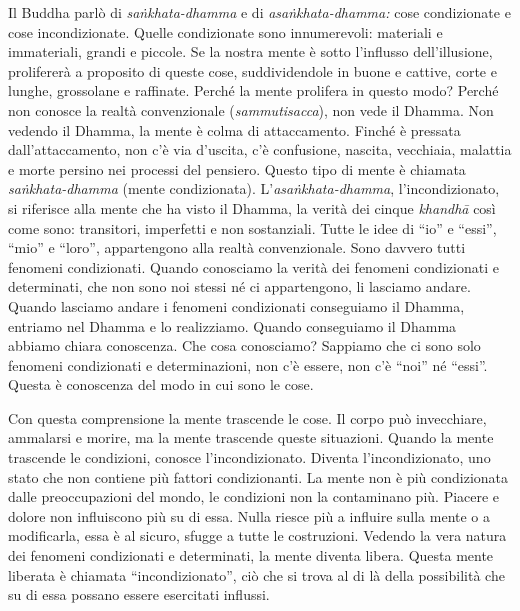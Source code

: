 Il Buddha parlò di \emph{saṅkhata-dhamma} e di \emph{asaṅkhata-dhamma:}
cose condizionate e cose incondizionate. Quelle condizionate sono
innumerevoli: materiali e immateriali, grandi e piccole. Se la nostra
mente è sotto l'influsso dell'illusione, prolifererà a proposito di
queste cose, suddividendole in buone e cattive, corte e lunghe,
grossolane e raffinate. Perché la mente prolifera in questo modo? Perché
non conosce la realtà convenzionale (\emph{sammutisacca}), non vede il
Dhamma. Non vedendo il Dhamma, la mente è colma di attaccamento. Finché
è pressata dall'attaccamento, non c'è via d'uscita, c'è confusione,
nascita, vecchiaia, malattia e morte persino nei processi del pensiero.
Questo tipo di mente è chiamata \emph{saṅkhata-dhamma} (mente
condizionata). L'\emph{asaṅkhata-dhamma}, l'incondizionato, si
riferisce alla mente che ha visto il Dhamma, la verità dei cinque
\emph{khandhā} così come sono: transitori, imperfetti e non sostanziali.
Tutte le idee di ``io'' e ``essi'', ``mio'' e ``loro'', appartengono
alla realtà convenzionale. Sono davvero tutti fenomeni condizionati.
Quando conosciamo la verità dei fenomeni condizionati e determinati, che
non sono noi stessi né ci appartengono, li lasciamo andare. Quando
lasciamo andare i fenomeni condizionati conseguiamo il Dhamma, entriamo
nel Dhamma e lo realizziamo. Quando conseguiamo il Dhamma abbiamo chiara
conoscenza. Che cosa conosciamo? Sappiamo che ci sono solo fenomeni
condizionati e determinazioni, non c'è essere, non c'è ``noi'' né
``essi''. Questa è conoscenza del modo in cui sono le cose.

Con questa comprensione la mente trascende le cose. Il corpo può
invecchiare, ammalarsi e morire, ma la mente trascende queste
situazioni. Quando la mente trascende le condizioni, conosce
l'incondizionato. Diventa l'incondizionato, uno stato che non contiene
più fattori condizionanti. La mente non è più condizionata dalle
preoccupazioni del mondo, le condizioni non la contaminano più. Piacere
e dolore non influiscono più su di essa. Nulla riesce più a influire
sulla mente o a modificarla, essa è al sicuro, sfugge a tutte le
costruzioni. Vedendo la vera natura dei fenomeni condizionati e
determinati, la mente diventa libera. Questa mente liberata è chiamata
``incondizionato'', ciò che si trova al di là della possibilità che su
di essa possano essere esercitati influssi.

